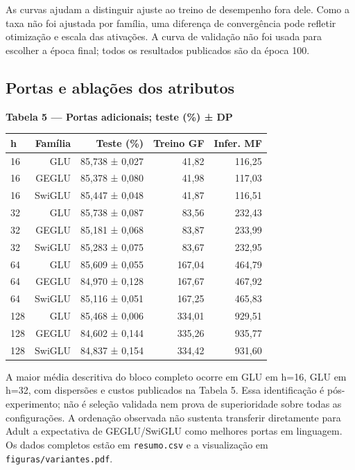 \documentclass[10pt,a4paper]{article}
\begin{document}
As curvas ajudam a distinguir ajuste ao treino de desempenho fora dele. Como a taxa não foi ajustada por família, uma diferença de convergência pode refletir otimização e escala das ativações. A curva de validação não foi usada para escolher a época final; todos os resultados publicados são da época 100.


\clearpage

\subsection*{Portas e ablações dos atributos}
\noindent\textbf{Tabela 5 — Portas adicionais; teste (\%) ± DP}

{\footnotesize\setlength{\tabcolsep}{4pt}\begin{center}\begin{tabular}{lrrrr}\toprule
h & Família & Teste (\%) & Treino GF & Infer. MF\\\midrule
16 & GLU & 85,738 ± 0,027 & 41,82 & 116,25\\
16 & GEGLU & 85,378 ± 0,080 & 41,98 & 117,03\\
16 & SwiGLU & 85,447 ± 0,048 & 41,87 & 116,51\\
32 & GLU & 85,738 ± 0,087 & 83,56 & 232,43\\
32 & GEGLU & 85,181 ± 0,068 & 83,87 & 233,99\\
32 & SwiGLU & 85,283 ± 0,075 & 83,67 & 232,95\\
64 & GLU & 85,609 ± 0,055 & 167,04 & 464,79\\
64 & GEGLU & 84,970 ± 0,128 & 167,67 & 467,92\\
64 & SwiGLU & 85,116 ± 0,051 & 167,25 & 465,83\\
128 & GLU & 85,468 ± 0,006 & 334,01 & 929,51\\
128 & GEGLU & 84,602 ± 0,144 & 335,26 & 935,77\\
128 & SwiGLU & 84,837 ± 0,154 & 334,42 & 931,60\\
\bottomrule\end{tabular}\end{center}}

A maior média descritiva do bloco completo ocorre em GLU em h=16, GLU em h=32, com dispersões e custos publicados na Tabela 5. Essa identificação é pós-experimento; não é seleção validada nem prova de superioridade sobre todas as configurações. A ordenação observada não sustenta transferir diretamente para Adult a expectativa de GEGLU/SwiGLU como melhores portas em linguagem. Os dados completos estão em \texttt{resumo.csv} e a visualização em \texttt{figuras/\allowbreak{}variantes.pdf}.
\end{document}
